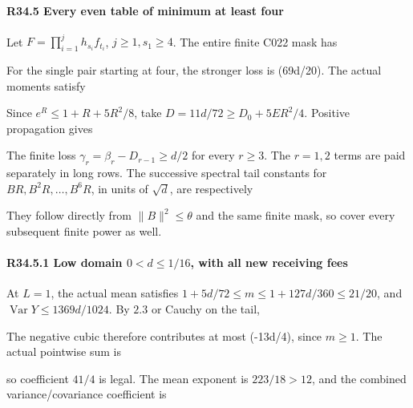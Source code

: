 \paragraph{R34.5 Every even table of minimum at least four}

Let \(F=\prod_{i=1}^j h_{s_i}f_{t_i}\), \(j\ge1,\allowbreak  s_1\ge4\).
The entire finite C022 mask has


For the single pair starting at four, the stronger loss is (69d/20).
The actual moments satisfy


Since \(e^R\le1+R+5R^2/8\), take \(D=11d/72\ge D_0+5ER^2/4\).
Positive propagation gives


The finite loss \(\gamma_r=\beta_r-D_{r-1}\ge d/2\) for every \(r\ge3\).
The \(r=1,\allowbreak  2\) terms are paid separately in long rows. The successive
spectral tail constants for \(BR,\allowbreak  B^2R,\allowbreak  \ldots,\allowbreak  B^6R\), in units of
\(\sqrt d\), are respectively


They follow directly from \(\|B\|^2\le\theta\) and the same finite
mask, so cover every subsequent finite power as well.

\paragraph{R34.5.1 Low domain \(0<d\le1/16\), with all new receiving fees}

At \(L=1\), the actual mean satisfies
\(1+5d/72\le m\le1+127d/360\le21/20\), and
\(\operatorname{\operatorname{Var}}Y\le1369d/1024\). By \(2.3\) or Cauchy on the tail,


The negative cubic therefore contributes at most (-13d/4), since
\(m\ge1\). The actual pointwise sum is


so coefficient \(41/4\) is legal. The mean exponent is \(223/18>12\),
and the combined variance/covariance coefficient is


